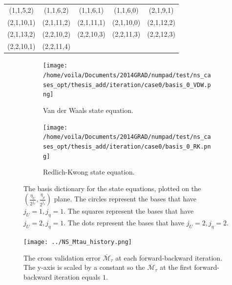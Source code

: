 \begin{center}\begin{tabular}{ccccc}
(1,1,5,2)  & (1,1,6,2)  & (1,1,6,1)  & (1,1,6,0)  & (2,1,9,1) \\
(2,1,10,1) & (2,1,11,2) & (2,1,11,1) & (2,1,10,0) & (2,1,12,2)\\
(2,1,13,2) & (2,2,10,2) & (2,2,10,3) & (2,2,11,3) & (2,2,12,3)\\
(2,2,10,1) & (2,2,11,4) & & & 
\end{tabular}
\label{tab: basis list 2}\end{center}

\begin{figure}[htbp]\begin{center}
    \begin{subfigure}[t]{.49\textwidth}
        \centering
        \texttt{[image: /home/voila/Documents/2014GRAD/numpad/test/ns\_cases\_opt/thesis\_add/iteration/case0/basis\_0\_VDW.png]}
        \caption{Van der Waals state equation.}
        \label{fig: selected basis NS 1}
    \end{subfigure}
    \begin{subfigure}[t]{.49\textwidth}
        \centering
        \texttt{[image: /home/voila/Documents/2014GRAD/numpad/test/ns\_cases\_opt/thesis\_add/iteration/case0/basis\_0\_RK.png]}
        \caption{Redlich-Kwong state equation.}
        \label{fig: selected basis NS 2}
    \end{subfigure}
    \caption{The basis dictionary for the state equations, plotted on the $(\frac{\eta_U}{2^{j_U}},
             \frac{\eta_\rho}{2^{j_\rho}})$ plane. The circles represent the bases that have
             $j_U=1, j_\eta=1$. The squares represent the bases that have $j_U=2,j_\eta=1$.
             The dots represent the bases that have $j_U=2, j_\eta=2$.}
    \label{fig: selected basis NS}
\end{center}\end{figure}



\begin{figure}[htbp]
    \begin{center}
        \texttt{[image: ../NS\_Mtau\_history.png]}
        \caption{The cross validation error $\overline{\mathcal{M}}_{\tau}$ at 
                 each forward-backward iteration. The y-axis is scaled by a constant
                 so the $\overline{\mathcal{M}}_\tau$ at the first forward-backward
                 iteration equals $1$.}
        \label{fig: NS Mtau history}
    \end{center}
\end{figure}

